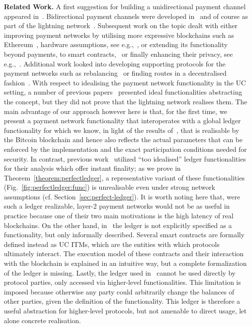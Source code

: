 \noindent \textbf{Related Work.} A first suggestion for building a
unidirectional payment channel appeared in~\cite{spilman}. Bidirectional payment
channels were developed in~\cite{DBLP:conf/sss/DeckerW15} and of course as part
of the lightning network~\cite{lightning}. Subsequent work on the topic dealt
with either improving payment networks by utilising more expressive blockchains
such as Ethereum~\cite{perun}, hardware assumptions, see
e.g.,~\cite{DBLP:conf/systor/LindNEKPS18}, or extending its functionality beyond
payments, to smart contracts,~\cite{sprites} or finally enhancing their privacy,
see
e.g.,~\cite{Malavolta:2017:CPP:3133956.3134096,DBLP:conf/ccs/0001M17,DBLP:conf/ndss/HeilmanABSG17}.
Additional work looked into developing supporting protocols for the payment
networks such as rebalancing~\cite{DBLP:conf/ccs/KhalilG17} or finding routes in
a decentralised fashion~\cite{flare,spider}. With respect to idealising the
payment network functionality in the UC setting, a number of previous
papers~\cite{DBLP:conf/ccs/DziembowskiFH18,Malavolta:2017:CPP:3133956.3134096,sprites,perun}
presented ideal functionalities abstracting the concept, but they did not prove
that the lightning network realises them. The main advantage of our approach
however here is that, for the first time, we present a payment network
functionality that interoperates with a global ledger functionality for which we
know, in light of the results of~\cite{BMTZ17}, that is realisable by the
Bitcoin blockchain and hence also reflects the actual parameters that can be
enforced by the implementation and the exact participation conditions needed for
security. In contrast, previous
work~\cite{DBLP:conf/ccs/DziembowskiFH18,Malavolta:2017:CPP:3133956.3134096,perun}
utilized ``too idealised'' ledger functionalities for their analysis which offer
instant finality; as we prove in Theorem~\ref{theorem:perfectledger}, a
representative variant of these functionalities
(Fig.~\ref{fig:perfectledger:func}) is unrealisable even under strong network
assumptions (cf. Section~\ref{sec:perfect-ledger}). It is worth noting here
that, were such a ledger realizable, layer-2 payment networks would not be as
useful in practice because one of their two main motivations is the high latency
of real blockchains. On the other hand, in~\cite{sprites} the ledger is not
explicitly specified as a functionality, but only informally described. Several
smart contracts are formally defined instead as UC ITMs, which are the entities
with which protocols ultimately interact. The execution model of these contracts
and their interaction with the blockchain is explained in an intuitive way, but
a complete formalization of the ledger is missing. Lastly, the ledger used
in~\cite{DBLP:conf/ccs/DziembowskiFH18} cannot be used directly by protocol
parties, only accessed via higher-level functionalities. This limitation is
imposed because otherwise any party could arbitrarily change the balances of
other parties, given the definition of the functionality. This ledger is
therefore a useful abstraction for higher-level protocols, but not amenable to
direct usage, let alone concrete realisation.

